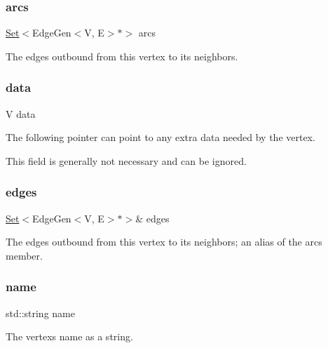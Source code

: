 \subsubsection{\texorpdfstring{arcs}{arcs}}
{\footnotesize\ttfamily \mbox{\hyperlink{classstanfordcpplib_1_1collections_1_1GenericSet}{Set}}$<$Edge\+Gen$<$V, E$>$$\ast$$>$ arcs}



The edges outbound from this vertex to its neighbors. 

\mbox{\label{classVertexGen_a0cff2e152738a487e0930e21b7824c40}} 
\subsubsection{\texorpdfstring{data}{data}}
{\footnotesize\ttfamily V data}



The following pointer can point to any extra data needed by the vertex. 

This field is generally not necessary and can be ignored. \mbox{\label{classVertexGen_a795e7fd80b24c26fdd9fa879db40a403}} 
\subsubsection{\texorpdfstring{edges}{edges}}
{\footnotesize\ttfamily \mbox{\hyperlink{classstanfordcpplib_1_1collections_1_1GenericSet}{Set}}$<$Edge\+Gen$<$V, E$>$$\ast$$>$\& edges}



The edges outbound from this vertex to its neighbors; an alias of the \textquotesingle{}arcs\textquotesingle{} member. 

\mbox{\label{classVertexGen_a9b45b3e13bd9167aab02e17e08916231}} 
\subsubsection{\texorpdfstring{name}{name}}
{\footnotesize\ttfamily std\+::string name}



The vertex\textquotesingle{}s name as a string. 


